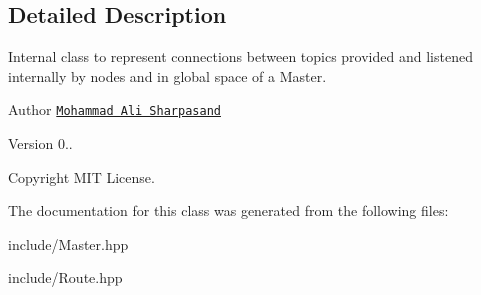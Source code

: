 \subsection{Detailed Description}
Internal class to represent connections between topics provided and listened internally by nodes and in global space of a Master. 

\begin{DoxyAuthor}{Author}
\href{mailto:a.sharpasand@mrl-spl.ir}{\tt Mohammad Ali Sharpasand} 
\end{DoxyAuthor}
\begin{DoxyVersion}{Version}
0.. 
\end{DoxyVersion}
\begin{DoxyCopyright}{Copyright}
M\+IT License. 
\end{DoxyCopyright}


The documentation for this class was generated from the following files\+:\begin{DoxyCompactItemize}
\item 
include/Master.\+hpp\item 
include/Route.\+hpp\end{DoxyCompactItemize}
